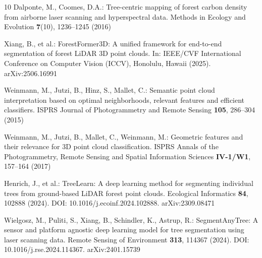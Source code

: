 \documentclass{cys}
\begin{document}
\begin{thebibliography}{10}
Dalponte, M., Coomes, D.A.:
Tree-centric mapping of forest carbon density from airborne laser scanning and hyperspectral data.
Methods in Ecology and Evolution \textbf{7}(10), 1236--1245 (2016)

Xiang, B., et al.:
ForestFormer3D: A unified framework for end-to-end segmentation of forest LiDAR 3D point clouds.
In: IEEE/CVF International Conference on Computer Vision (ICCV), Honolulu, Hawaii (2025).
arXiv:2506.16991

Weinmann, M., Jutzi, B., Hinz, S., Mallet, C.:
Semantic point cloud interpretation based on optimal neighborhoods, relevant features and efficient classifiers.
ISPRS Journal of Photogrammetry and Remote Sensing \textbf{105}, 286--304 (2015)

Weinmann, M., Jutzi, B., Mallet, C., Weinmann, M.:
Geometric features and their relevance for 3D point cloud classification.
ISPRS Annals of the Photogrammetry, Remote Sensing and Spatial Information Sciences \textbf{IV-1/W1}, 157--164 (2017)


Henrich, J., et al.:
TreeLearn: A deep learning method for segmenting individual trees from ground-based LiDAR forest point clouds.
Ecological Informatics \textbf{84}, 102888 (2024).
DOI: 10.1016/j.ecoinf.2024.102888. arXiv:2309.08471

Wielgosz, M., Puliti, S., Xiang, B., Schindler, K., Astrup, R.:
SegmentAnyTree: A sensor and platform agnostic deep learning model for tree segmentation using laser scanning data.
Remote Sensing of Environment \textbf{313}, 114367 (2024).
DOI: 10.1016/j.rse.2024.114367. arXiv:2401.15739


\end{thebibliography}

\begin{biography}[]{}
\end{biography}
\end{document}
